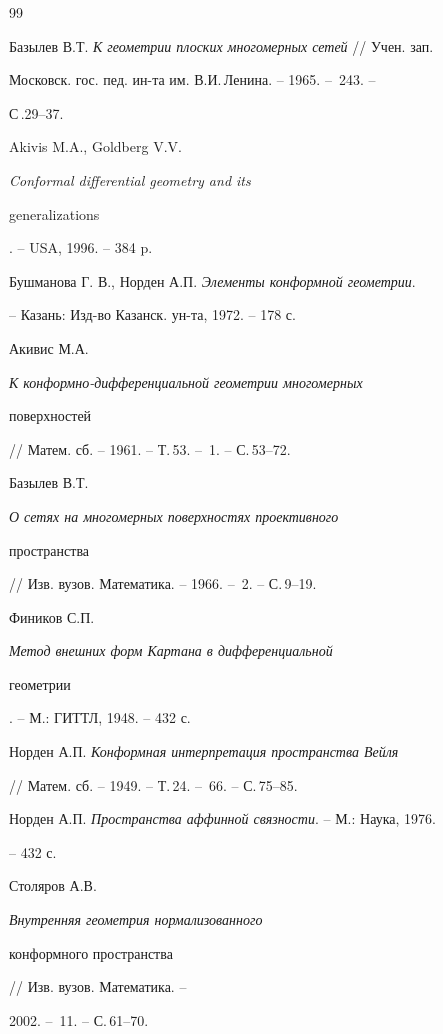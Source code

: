 \begin{thebibliography}{99} 


 


\bibitem{} 


Базылев В.Т. {\em К геометрии плоских многомерных сетей} // Учен. зап. 


Московск. гос. пед. ин-та им. В.И.\,Ленина. -- 1965. -- \No\,243. -- 


С\,.29--37. 




Akivis M.A., Goldberg V.V. {\em Conformal differential geometry and its 


generalizations}. -- USA, 1996. -- 384 p. 




Бушманова Г. В., Норден А.П. {\em Элементы конформной геометрии}. 


-- Казань: Изд-во Казанск. ун-та, 1972. -- 178 с. 




Акивис М.А. {\em К конформно-дифференциальной геометрии многомерных 


поверхностей} // Матем. сб. -- 1961. -- Т.\,53. -- \No\,1. -- С.\,53--72. 




Базылев В.Т. {\em О сетях на многомерных поверхностях проективного 


пространства} // Изв. вузов. Математика. -- 1966. -- \No\,2. -- С.\,9--19. 




Фиников С.П. {\em Метод внешних форм Картана в дифференциальной 


геометрии}. -- М.: ГИТТЛ, 1948. -- 432 с. 




Норден А.П. {\em Конформная интерпретация пространства Вейля} 


// Матем. сб. -- 1949. -- Т.\,24. -- \No\,66. -- С.\,75--85. 




Норден А.П. {\em Пространства аффинной связности}. -- М.: Наука, 1976. 


-- 432 с. 




Столяров А.В. {\em Внутренняя геометрия нормализованного 


конформного пространства} // Изв. вузов. Математика. -- 


2002. -- \No\,11. -- С.\,61--70. 



\end{thebibliography}
